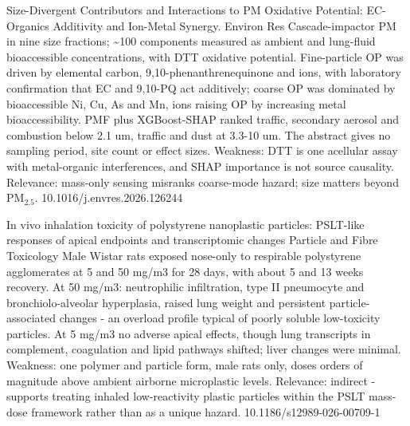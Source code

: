 \documentclass[10pt]{article}
\begin{document}
{Size-Divergent Contributors and Interactions to PM Oxidative Potential: EC-Organics Additivity and Ion-Metal Synergy.}
{Environ Res}
{Cascade-impactor PM in nine size fractions; \textasciitilde{}100 components measured as ambient and lung-fluid bioaccessible concentrations, with DTT oxidative potential. Fine-particle OP was driven by elemental carbon, 9,10-phenanthrenequinone and ions, with laboratory confirmation that EC and 9,10-PQ act additively; coarse OP was dominated by bioaccessible Ni, Cu, As and Mn, ions raising OP by increasing metal bioaccessibility. PMF plus XGBoost-SHAP ranked traffic, secondary aerosol and combustion below 2.1 um, traffic and dust at 3.3-10 um. The abstract gives no sampling period, site count or effect sizes. Weakness: DTT is one acellular assay with metal-organic interferences, and SHAP importance is not source causality. Relevance: mass-only sensing misranks coarse-mode hazard; size matters beyond PM$_{2.5}$.}
{10.1016/j.envres.2026.126244}

{In vivo inhalation toxicity of polystyrene nanoplastic particles: PSLT-like responses of apical endpoints and transcriptomic changes}
{Particle and Fibre Toxicology}
{Male Wistar rats exposed nose-only to respirable polystyrene agglomerates at 5 and 50 mg/m3 for 28 days, with about 5 and 13 weeks recovery. At 50 mg/m3: neutrophilic infiltration, type II pneumocyte and bronchiolo-alveolar hyperplasia, raised lung weight and persistent particle-associated changes - an overload profile typical of poorly soluble low-toxicity particles. At 5 mg/m3 no adverse apical effects, though lung transcripts in complement, coagulation and lipid pathways shifted; liver changes were minimal. Weakness: one polymer and particle form, male rats only, doses orders of magnitude above ambient airborne microplastic levels. Relevance: indirect - supports treating inhaled low-reactivity plastic particles within the PSLT mass-dose framework rather than as a unique hazard.}
{10.1186/s12989-026-00709-1}
\end{document}
